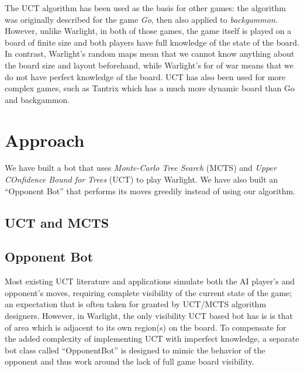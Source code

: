 \documentclass[a4paper,11pt]{article}
\begin{document}
The UCT algorithm has been used as the basis for other games: the algorithm was originally described for the game \emph{Go}\cite{uct}, then also applied to \emph{backgammon}\cite{uctback}.  However, unlike Warlight, in both of those games, the game itself is played on a board of finite size and both players have full knowledge of the state of the board.  In contrast, Warlight's random maps mean that we cannot know anything about the board size and layout beforehand, while Warlight's for of war means that we do not have perfect knowledge of the board. UCT has also been used for more complex games, such as Tantrix\cite{tantrix} which has a much more dynamic board than Go and backgammon.

\section{Approach}\label{sec:approach}
We have built a bot that uses \emph{Monte-Carlo Tree Search} (MCTS) and \emph{Upper COnfidence Bound for Trees} (UCT) to play Warlight.  We have also built an ``Opponent Bot'' that performs its moves greedily instead of using our algorithm.

\subsection{UCT and MCTS}

\subsection{Opponent Bot}
Most existing UCT literature and applications simulate both the AI player's and opponent's
moves, requiring complete visibility of the current state of the game; an expectation that
is often taken for granted by UCT/MCTS algorithm designers. However, in Warlight, the only
visibility UCT based bot has is is that of area which is adjacent to its own region(s) on 
the board. To compensate for the added complexity of implementing UCT with imperfect 
knowledge, a separate bot class called ``OpponentBot'' is designed to mimic the behavior of 
the opponent and thus work around the lack of full game board visibility.
\end{document}
